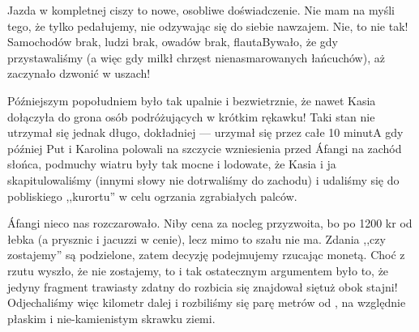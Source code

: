 
Jazda w kompletnej ciszy to nowe, osobliwe doświadczenie. Nie mam na myśli tego, że tylko pedałujemy, nie odzywając się do siebie nawzajem. Nie, to nie tak! Samochodów brak, ludzi brak, owadów brak, flauta\textellipsis Bywało, że gdy przystawaliśmy (a więc gdy milkł chrzęst nienasmarowanych łańcuchów), aż zaczynało dzwonić w uszach!

Późniejszym popołudniem było tak upalnie i bezwietrznie, że nawet Kasia dołączyła do grona osób podróżujących w krótkim rękawku! Taki stan nie utrzymał się jednak długo, dokładniej --- urzymał się przez całe 10 minut\textellipsis A gdy później Put i Karolina polowali na szczycie wzniesienia przed Áfangi na zachód słońca, podmuchy wiatru były tak mocne i lodowate, że Kasia i ja skapitulowaliśmy (innymi słowy nie dotrwaliśmy do zachodu) i udaliśmy się do pobliskiego ,,kurortu'' w celu ogrzania zgrabiałych palców.

Áfangi nieco nas rozczarowało. Niby cena za nocleg przyzwoita, bo po 1200 kr od łebka (a prysznic i jacuzzi w cenie), lecz mimo to szału nie ma. Zdania ,,czy zostajemy'' są podzielone, zatem decyzję podejmujemy rzucając monetą. Choć z rzutu wyszło, że nie zostajemy, to i tak ostatecznym argumentem było to, że jedyny fragment trawiasty zdatny do rozbicia się znajdował się\textellipsis tuż obok stajni! Odjechaliśmy więc kilometr dalej i rozbiliśmy się parę metrów od , na względnie płaskim i nie-kamienistym skrawku ziemi.

